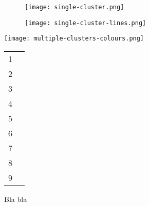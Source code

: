 \begin{figure}[tbhp]
	\centering
	\begin{subfigure}[c]{0.48\linewidth}
		\texttt{[image: single-cluster.png]}
		\caption{}\label{fig:single-cluster-points}
	\end{subfigure}%
	\quad
	\begin{subfigure}[c]{0.48\linewidth}
		\texttt{[image: single-cluster-lines.png]}
		\caption{}\label{fig:single-cluster-lines}
	\end{subfigure}
	\caption{} \label{fig:single-cluster}
\end{figure}

\begin{figure}[tbhp]
	\begin{minipage}[b]{0.85\linewidth}
		\centering
		\texttt{[image: multiple-clusters-colours.png]}
	\end{minipage}%
	\begin{minipage}[b]{0.1\linewidth}
		\centering
		\begin{tabular}[b]{ l l }
			\cellcolor[HTML]{FCE94F}1\\
			\cellcolor[HTML]{FCAF3E}2\\
			\cellcolor[HTML]{E9B96E}3\\
			\cellcolor[HTML]{8AE234}4\\
			\cellcolor[HTML]{729FCF}5\\
			\cellcolor[HTML]{AD7FA8}6\\
			\cellcolor[HTML]{EF2929}7\\
			\cellcolor[HTML]{D3D7CF}8\\
			\cellcolor[HTML]{888A85}9\\
		\end{tabular}
	\end{minipage}
	\caption{Bla bla}
	\label{fig:multiple-clusters-colours.png}
\end{figure}

